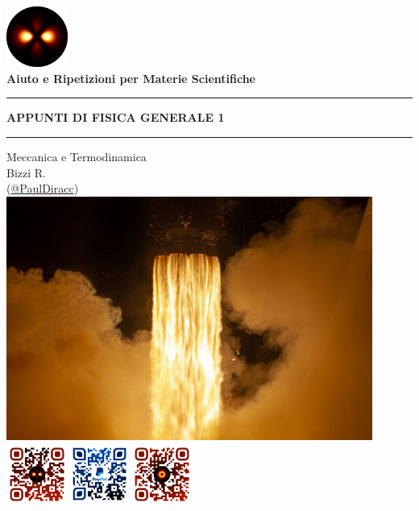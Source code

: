 \begin{titlepage}
\begin{center}
\href{\Grouplink}{\includegraphics[width=0.15\textwidth]{../logo.png}}\\
\huge{\textbf{Aiuto e Ripetizioni per Materie Scientifiche}}\\
\vspace{25mm}
\hrule
\vspace{2.5mm}
\Huge{\textbf{APPUNTI DI FISICA GENERALE 1}}
\vspace{2.5mm}
\hrule
\vspace{3.5mm}
\Large{Meccanica e Termodinamica}
\\[2.5mm]
\normalsize{
    Bizzi R.\\
    \textcolor[RGB]{\hashcolor}{(\href{\Riccardolink}{\textcolor[RGB]{\hashcolor}{@PaulDiracc}})}
}
\\[8mm]
\href{https://www.esa.int/ESA_Multimedia/Images/2021/04/Dragon_fire}{
    \includegraphics[width=0.9\textwidth]{images/cop.jpg}}
\\[15mm]
\href{\Grouplink}{\includegraphics[width=0.15\textwidth]{../QR_group.png}}\qquad
\href{\PayPallink}{\includegraphics[width=0.14\textwidth]{../QR_PayPal.png}}\qquad
\href{\Riccardolink}{\includegraphics[width=0.15\textwidth]{../QR_me.png}}
\end{center}
\end{titlepage}
